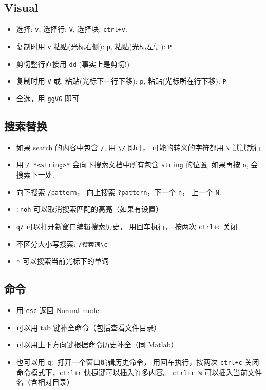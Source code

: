 \subsection{Visual}
\begin{itemize}
\item 选择: \verb`v`, 选择行: \verb`V`, 选择块: \verb`ctrl+v`.
\item 复制时用 \verb`v` 粘贴(光标右侧): \verb`p`, 粘贴(光标左侧): \verb`P`
\item 剪切整行直接用 \verb`dd` (事实上是剪切!)
\item 复制时用 \verb`V` 或, 粘贴(光标下一行下移): \verb`p`, 粘贴(光标所在行下移): \verb`P`
\item 全选，用 \verb`ggVG` 即可
\end{itemize}

\subsection{搜索替换}
\begin{itemize}
\item 如果 search 的内容中包含 \verb`/`, 用 \verb`\/` 即可， 可能的转义的字符都用 \verb`\` 试试就行
\item 用 \verb`/ *<string>*` 会向下搜索文档中所有包含 \verb`string` 的位置, 如果再按 \verb`n`, 会搜索下一处. 
\item 向下搜索 \verb`/pattern`， 向上搜索 \verb`?pattern`，下一个 \verb`n`， 上一个 \verb`N`.
\item \verb`:noh` 可以取消搜索匹配的高亮（如果有设置）
\item \verb`q/` 可以打开新窗口编辑搜索历史， 用回车执行， 按两次 \verb`ctrl+c` 关闭
\item 不区分大小写搜索:  \verb`/搜索词\c`
\item \verb`*` 可以搜索当前光标下的单词
\end{itemize}

\subsection{命令}
\begin{itemize}
\item 用 \verb`esc` 返回 Normal mode
\item 可以用 tab 键补全命令（包括查看文件目录）
\item 可以用上下方向键根据命令历史补全（同 Matlab）
\item 也可以用 \verb`q:` 打开一个窗口编辑历史命令， 用回车执行，按两次 \verb`ctrl+c` 关闭
命令模式下，\verb`ctrl+r` 快捷键可以插入许多内容。 \verb`ctrl+r %` 可以插入当前文件名（含相对目录）
\end{itemize}

